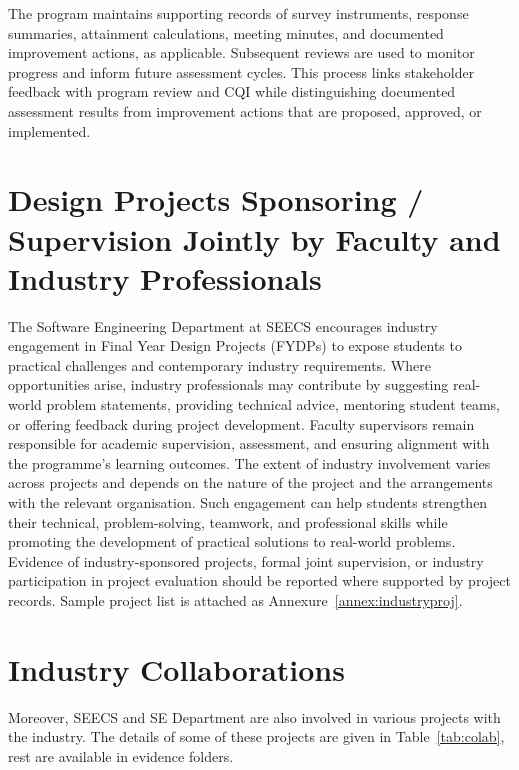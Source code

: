 The program maintains supporting records of survey instruments, response summaries, attainment calculations, meeting minutes, and documented improvement actions, as applicable. Subsequent reviews are used to monitor progress and inform future assessment cycles. This process links stakeholder feedback with program review and CQI while distinguishing documented assessment results from improvement actions that are proposed, approved, or implemented.

\section{Design Projects Sponsoring / Supervision Jointly by Faculty and Industry Professionals}\label{sec:c9-design-projects}

The Software Engineering Department at SEECS encourages industry engagement in Final Year Design Projects (FYDPs) to expose students to practical challenges and contemporary industry requirements. Where opportunities arise, industry professionals may contribute by suggesting real-world problem statements, providing technical advice, mentoring student teams, or offering feedback during project development. Faculty supervisors remain responsible for academic supervision, assessment, and ensuring alignment with the programme's learning outcomes. The extent of industry involvement varies across projects and depends on the nature of the project and the arrangements with the relevant organisation. Such engagement can help students strengthen their technical, problem-solving, teamwork, and professional skills while promoting the development of practical solutions to real-world problems. Evidence of industry-sponsored projects, formal joint supervision, or industry participation in project evaluation should be reported where supported by project records. Sample project list is attached as Annexure~\ref{annex:industryproj}.

\section{Industry Collaborations}\label{sec:c9-industry-collab}

Moreover, SEECS and SE Department are also involved in various projects with the industry. The details of some of these projects are given in Table~\ref{tab:colab}, rest are available in evidence folders.


